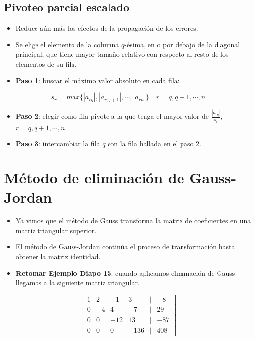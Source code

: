 \documentclass[openany]{book}
\providecommand{\tightlist}{%
  \setlength{\itemsep}{0pt}\setlength{\parskip}{0pt}}
\begin{document}
\hypertarget{pivoteo-parcial-escalado}{%
\subsection{Pivoteo parcial escalado}\label{pivoteo-parcial-escalado}}

\begin{itemize}
\tightlist
\item
  Reduce aún más los efectos de la propagación de los errores.
\item
  Se elige el elemento de la columna \(q\)-ésima, en o por debajo de la diagonal principal, que tiene mayor tamaño relativo con respecto al resto de los elementos de su fila.
\item
  \textbf{Paso 1}: buscar el máximo valor absoluto en cada fila:
\end{itemize}

\[
s_r = max\{|a_{rq}|, |a_{r,q+1}|, \cdots, |a_{rn}| \} \quad r = q, q+1, \cdots, n
\]

\begin{itemize}
\tightlist
\item
  \textbf{Paso 2}: elegir como fila pivote a la que tenga el mayor valor de \(\frac{|a_{rq}|}{s_r}\), \(r = q, q+1, \cdots, n\).
\item
  \textbf{Paso 3}: intercambiar la fila \(q\) con la fila hallada en el paso 2.
\end{itemize}

\hypertarget{muxe9todo-de-eliminaciuxf3n-de-gauss-jordan}{%
\section{Método de eliminación de Gauss-Jordan}\label{muxe9todo-de-eliminaciuxf3n-de-gauss-jordan}}

\begin{itemize}
\tightlist
\item
  Ya vimos que el método de Gauss transforma la matriz de coeficientes en una matriz triangular superior.
\item
  El método de Gauss-Jordan continúa el proceso de transformación hasta obtener la matriz identidad.
\item
  \textbf{Retomar Ejemplo Diapo 15}: cuando aplicamos eliminación de Gauss llegamos a la siguiente matriz triangular.
\end{itemize}

\[
\begin{bmatrix}
1 & 2 & -1 & 3 &|& -8\\
0 & -4 & 4 & -7 &|& 29\\
0 & 0 & -12 & 13 &|& -87\\
0 & 0 & 0 & -136 &|& 408  
\end{bmatrix}
\]
\end{document}
